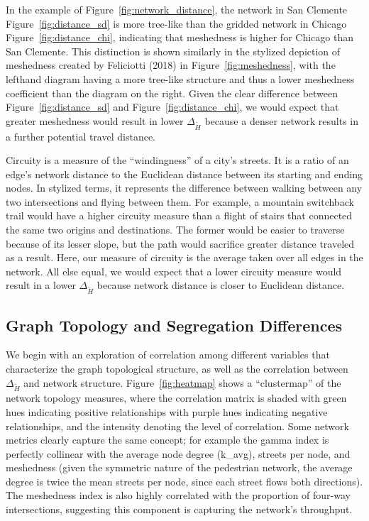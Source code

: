 \documentclass[
  10pt,
]{article}
\begin{document}
In the example of Figure~\ref{fig:network_distance}, the network in San
Clemente Figure~\ref{fig:distance_sd} is more tree-like than the gridded
network in Chicago Figure~\ref{fig:distance_chi}, indicating that
meshedness is higher for Chicago than San Clemente. This distinction is
shown similarly in the stylized depiction of meshedness created by
Feliciotti (2018) in Figure~\ref{fig:meshedness}, with the lefthand
diagram having a more tree-like structure and thus a lower meshedness
coefficient than the diagram on the right. Given the clear difference
between Figure~\ref{fig:distance_sd} and Figure~\ref{fig:distance_chi},
we would expect that greater meshedness would result in lower
\(\Delta_{\tilde{H}}\) because a denser network results in a further
potential travel distance.

Circuity is a measure of the ``windingness'' of a city's streets. It is
a ratio of an edge's network distance to the Euclidean distance between
its starting and ending nodes. In stylized terms, it represents the
difference between walking between any two intersections and flying
between them. For example, a mountain switchback trail would have a
higher circuity measure than a flight of stairs that connected the same
two origins and destinations. The former would be easier to traverse
because of its lesser slope, but the path would sacrifice greater
distance traveled as a result. Here, our measure of circuity is the
average taken over all edges in the network. All else equal, we would
expect that a lower circuity measure would result in a lower
\(\Delta_{\tilde{H}}\) because network distance is closer to Euclidean
distance.

\hypertarget{graph-topology-and-segregation-differences}{%
\subsection{Graph Topology and Segregation
Differences}\label{graph-topology-and-segregation-differences}}

We begin with an exploration of correlation among different variables
that characterize the graph topological structure, as well as the
correlation between \(\Delta_{\tilde{H}}\) and network structure.
Figure~\ref{fig:heatmap} shows a ``clustermap'' of the network topology
measures, where the correlation matrix is shaded with green hues
indicating positive relationships with purple hues indicating negative
relationships, and the intensity denoting the level of correlation. Some
network metrics clearly capture the same concept; for example the gamma
index is perfectly collinear with the average node degree (k\_avg),
streets per node, and meshedness (given the symmetric nature of the
pedestrian network, the average degree is twice the mean streets per
node, since each street flows both directions). The meshedness index is
also highly correlated with the proportion of four-way intersections,
suggesting this component is capturing the network's throughput.
\end{document}
